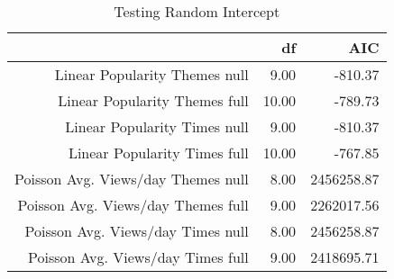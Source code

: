 
\begin{table}[ht]
	   \caption{Testing Random Intercept} 
	\label{aic}
\centering
\begin{tabular}{rrr}
  \hline
 & df & AIC \\ 
  \hline
Linear Popularity Themes null & 9.00 & -810.37 \\ 
Linear Popularity Themes full & 10.00 & -789.73 \\ 
Linear Popularity Times null & 9.00 & -810.37 \\ 
Linear Popularity Times full & 10.00 & -767.85 \\ 
Poisson Avg. Views/day Themes null & 8.00 & 2456258.87 \\ 
Poisson Avg. Views/day Themes full & 9.00 & 2262017.56 \\ 
Poisson Avg. Views/day Times null & 8.00 & 2456258.87 \\ 
Poisson Avg. Views/day Times full & 9.00 & 2418695.71 \\ 
   \hline
\end{tabular}
\end{table}
